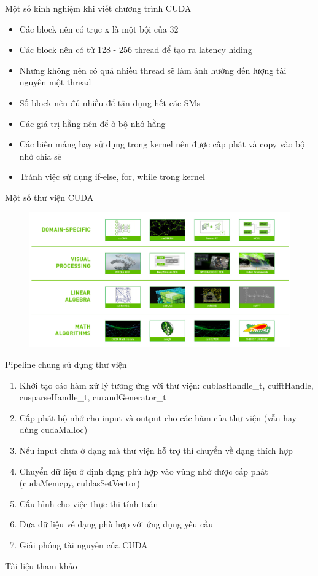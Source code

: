 \documentclass[10pt]{beamer}
\theoremstyle{remark}
\numberwithin{algocf}{section}
\numberwithin{equation}{section}
\numberwithin{dl}{section}
\numberwithin{figure}{section}
\begin{document}
\begin{frame}{Một số kinh nghiệm khi viết chương trình CUDA}
    \begin{itemize}
        \item Các block nên có trục x là một bội của 32
        \item Các block nên có từ 128 - 256 thread để tạo ra latency hiding
        \item Nhưng không nên có quá nhiều thread sẽ làm ảnh hưởng đến lượng tài nguyên một thread
        \item Số block nên đủ nhiều để tận dụng hết các SMs
        \item Các giá trị hằng nên để ở bộ nhớ hằng
        \item Các biến mảng hay sử dụng trong kernel nên được cấp phát và copy vào bộ nhớ chia sẻ
        \item Tránh việc sử dụng if-else, for, while trong kernel 
    \end{itemize}
\end{frame}

\begin{frame}{Một số thư viện CUDA}
    \begin{figure}[H]
        \centering
        \includegraphics[width=0.8\linewidth]{figures/CUDA/CUDA_library.png}
    \end{figure}
\end{frame}

\begin{frame}{Pipeline chung sử dụng thư viện}
    \begin{enumerate}
        \item Khởi tạo các hàm xử lý tương ứng với thư viện:  cublasHandle\_t, cufftHandle,	
        cusparseHandle\_t, curandGenerator\_t
        \item Cấp phát bộ nhớ cho input và output cho các hàm của thư viện (vẫn hay dùng cudaMalloc)
        \item Nếu input chưa ở dạng mà thư viện hỗ trợ thì chuyển về dạng thích hợp
        \item Chuyển dữ liệu ở định dạng phù hợp vào vùng nhớ được cấp phát (cudaMemcpy, cublasSetVector)
        \item Cấu hình cho việc thực thi tính toán
        \item Đưa dữ liệu về dạng phù hợp với ứng dụng yêu cầu
        \item Giải phóng tài nguyên của CUDA
    \end{enumerate}
\end{frame}

\begin{frame}{Tài liệu tham khảo}
    \printbibliography
\end{frame}
\end{document}
